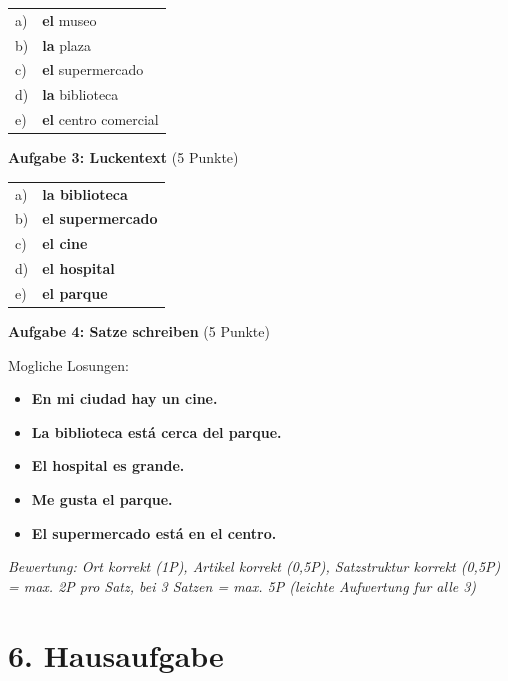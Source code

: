 \documentclass[11pt, a4paper]{article}
\newcommand{\loesung}[1]{\textcolor{loesung}{\textbf{#1}}}
\begin{document}
\begin{tabular}{ll}
a) & \loesung{el} museo \\
b) & \loesung{la} plaza \\
c) & \loesung{el} supermercado \\
d) & \loesung{la} biblioteca \\
e) & \loesung{el} centro comercial \\
\end{tabular}

\vspace{1em}

\textbf{Aufgabe 3: Luckentext} (5 Punkte)

\begin{tabular}{ll}
a) & \loesung{la biblioteca} \\
b) & \loesung{el supermercado} \\
c) & \loesung{el cine} \\
d) & \loesung{el hospital} \\
e) & \loesung{el parque} \\
\end{tabular}

\vspace{1em}

\textbf{Aufgabe 4: Satze schreiben} (5 Punkte)

Mogliche Losungen:
\begin{itemize}
    \item \loesung{En mi ciudad hay un cine.}
    \item \loesung{La biblioteca está cerca del parque.}
    \item \loesung{El hospital es grande.}
    \item \loesung{Me gusta el parque.}
    \item \loesung{El supermercado está en el centro.}
\end{itemize}

\textit{Bewertung: Ort korrekt (1P), Artikel korrekt (0,5P), Satzstruktur korrekt (0,5P) = max. 2P pro Satz, bei 3 Satzen = max. 5P (leichte Aufwertung fur alle 3)}


\section*{6. Hausaufgabe}
\end{document}

